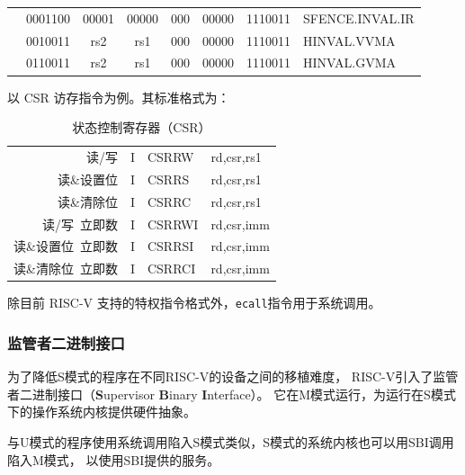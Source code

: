 \documentclass{../runikraft-report}
\begin{document}
{\begin{longtable}{p{0in}p{0.4in}p{0.05in}p{0.05in}p{0.05in}p{0.05in}p{0.4in}p{0.6in}p{0.4in}p{0.6in}p{0.7in}l}
    &
    \multicolumn{4}{|c|}{0001100} &
    \multicolumn{2}{c|}{00001} &
    \multicolumn{1}{c|}{00000} &
    \multicolumn{1}{c|}{000} &
    \multicolumn{1}{c|}{00000} &
    \multicolumn{1}{c|}{1110011} & SFENCE.INVAL.IR \\
    \cline{2-11}


    &
    \multicolumn{4}{|c|}{0010011} &
    \multicolumn{2}{c|}{rs2} &
    \multicolumn{1}{c|}{rs1} &
    \multicolumn{1}{c|}{000} &
    \multicolumn{1}{c|}{00000} &
    \multicolumn{1}{c|}{1110011} & HINVAL.VVMA \\
    \cline{2-11}


    &
    \multicolumn{4}{|c|}{0110011} &
    \multicolumn{2}{c|}{rs2} &
    \multicolumn{1}{c|}{rs1} &
    \multicolumn{1}{c|}{000} &
    \multicolumn{1}{c|}{00000} &
    \multicolumn{1}{c|}{1110011} & HINVAL.GVMA \\
    \cline{2-11}


    \end{longtable}
}

以 CSR 访存指令为例。其标准格式为：
\begin{table}[H]
    \centering
    \caption{状态控制寄存器（CSR）}
    \begin{tabular}{|r|c|>{\ttfamily}l>{\ttfamily}l|}
        \hline
        读/写&I&CSRRW&rd,csr,rs1\\
        读\&设置位&I&CSRRS&rd,csr,rs1\\
        读\&清除位&I&CSRRC&rd,csr,rs1\\
        读/写\ 立即数&I&CSRRWI&rd,csr,imm\\
        读\&设置位\ 立即数&I&CSRRSI&rd,csr,imm\\
        读\&清除位\ 立即数&I&CSRRCI&rd,csr,imm\\\hline
    \end{tabular}
\end{table}

除目前 RISC-V 支持的特权指令格式外，\texttt{ecall}指令用于系统调用。

\subsubsection{监管者二进制接口}
为了降低S模式的程序在不同RISC-V的设备之间的移植难度，
RISC-V引入了监管者二进制接口（\textbf{S}upervisor \textbf{B}inary \textbf{I}nterface）。
它在M模式运行，为运行在S模式下的操作系统内核提供硬件抽象。

与U模式的程序使用系统调用陷入S模式类似，S模式的系统内核也可以用SBI调用陷入M模式，
以使用SBI提供的服务。
\end{document}

